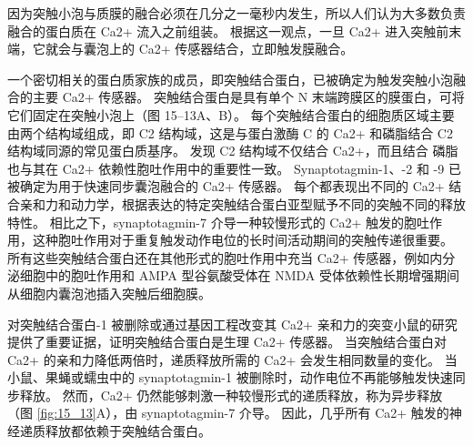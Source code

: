 因为突触小泡与质膜的融合必须在几分之一毫秒内发生，所以人们认为大多数负责融合的蛋白质在 Ca2+ 流入之前组装。 
根据这一观点，一旦 Ca2+ 进入突触前末端，它就会与囊泡上的 Ca2+ 传感器结合，立即触发膜融合。


一个密切相关的蛋白质家族的成员，即突触结合蛋白，已被确定为触发突触小泡融合的主要 Ca2+ 传感器。 
突触结合蛋白是具有单个 N 末端跨膜区的膜蛋白，可将它们固定在突触小泡上（图 15–13A、B）。 
每个突触结合蛋白的细胞质区域主要由两个结构域组成，即 C2 结构域，这是与蛋白激酶 C 的 Ca2+ 和磷脂结合 C2 结构域同源的常见蛋白质基序。
发现 C2 结构域不仅结合 Ca2+，而且结合 磷脂也与其在 Ca2+ 依赖性胞吐作用中的重要性一致。 
Synaptotagmin-1、-2 和 -9 已被确定为用于快速同步囊泡融合的 Ca2+ 传感器。 
每个都表现出不同的 Ca2+ 结合亲和力和动力学，根据表达的特定突触结合蛋白亚型赋予不同的突触不同的释放特性。 
相比之下，synaptotagmin-7 介导一种较慢形式的 Ca2+ 触发的胞吐作用，这种胞吐作用对于重复触发动作电位的长时间活动期间的突触传递很重要。 
所有这些突触结合蛋白还在其他形式的胞吐作用中充当 Ca2+ 传感器，例如内分泌细胞中的胞吐作用和 AMPA 型谷氨酸受体在 NMDA 受体依赖性长期增强期间从细胞内囊泡池插入突触后细胞膜。


对突触结合蛋白-1 被删除或通过基因工程改变其 Ca2+ 亲和力的突变小鼠的研究提供了重要证据，证明突触结合蛋白是生理 Ca2+ 传感器。 
当突触结合蛋白对 Ca2+ 的亲和力降低两倍时，递质释放所需的 Ca2+ 会发生相同数量的变化。 
当小鼠、果蝇或蠕虫中的 synaptotagmin-1 被删除时，动作电位不再能够触发快速同步释放。 
然而，Ca2+ 仍然能够刺激一种较慢形式的递质释放，称为异步释放（图 \ref{fig:15_13}A），由 synaptotagmin-7 介导。 
因此，几乎所有 Ca2+ 触发的神经递质释放都依赖于突触结合蛋白。

